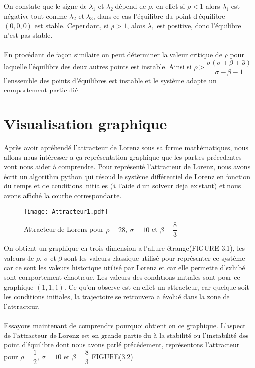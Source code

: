  On constate que le signe de  $\lambda_{1}$ et $\lambda_{2}$ dépend de $\rho$, en effet si $\rho<1$ alors $\lambda_{1}$ est négative tout comme $\lambda_{2}$ et $\lambda_{3}$, dans ce cas l'équilibre du point d'équilibre $(0,0,0)$ est stable. Cependant, si $\rho>1$, alors $\lambda_{1}$ est positive, donc l'équilibre n'est pas stable.\\\\
 En procédant de façon similaire on peut déterminer la valeur critique de $\rho$ pour laquelle l'équilibre des deux autres points est instable. Ainsi si $\rho > \dfrac{\sigma(\sigma+\beta+3)}{\sigma-\beta-1}$ l'enssemble des points d'équilibres est instable et le système adapte un comportement particulié.
 \section{Visualisation graphique}
Après avoir apréhendé l'attracteur de Lorenz sous sa forme mathématiques, nous allons nous intéresser a ça représentation graphique que les parties précedentes vont nous aider à comprendre. Pour représenté l'attracteur de Lorenz, nous avons écrit un algorithm python qui résoud le système différentiel de Lorenz en fonction du temps et de conditions initiales (à l'aide d'un solveur deja existant) et nous avons affiché la courbe correspondante.\\

\begin{figure}
        \texttt{[image: Attracteur1.pdf]}
        \caption{Attracteur de Lorenz pour $\rho=28$, $\sigma=10$ et $\beta=\dfrac{8}{3}$} 
\end{figure} 

On obtient un graphique en trois dimension a l'allure étrange(FIGURE 3.1), les valeurs de $\rho$, $\sigma$ et $\beta$ sont les valeurs classique utilisé pour représenter ce système car ce sont les valeurs historique utilisé par Lorenz et car elle permette d'exhibé sont comportement chaotique. Les valeurs des conditions initiales sont pour ce graphique $(1,1,1)$. Ce qu'on observe est en effet un attracteur, car quelque soit les conditions initiales, la trajectoire se retrouvera a évolué dans la zone de l'attracteur.\\\\
Essayons maintenant de comprendre pourquoi obtient on ce graphique. L'aspect de l'attracteur de Lorenz est en grande partie du à la stabilité ou l'instabilité des point d'équilibre dont nous avons parlé précédement, représentons l'attracteur pour $\rho=\dfrac{1}{2}$, $\sigma=10$ et $\beta=\dfrac{8}{3}$ FIGURE(3.2) 

